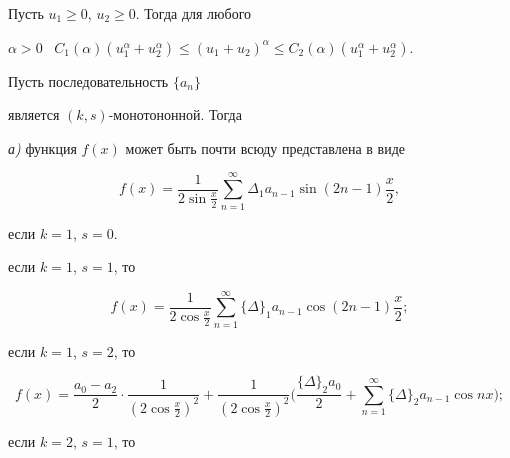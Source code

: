 \begin{lem}


Пусть $u_1\geq 0$, $u_2\geq 0$. Тогда для любого


$\alpha >0$ \ $C_1(\alpha )(u_1^\alpha +u_2^\alpha )\leq


(u_1+u_2)^\alpha \leq C_2(\alpha )(u_1^\alpha +u_2^\alpha )$.


\end{lem}





\begin{lem}


Пусть последовательность $\{a_n\}$


является $(k,s)$-монотононной. Тогда





{\em а)} функция $f(x)$ может быть почти всюду представлена в виде


$$


f(x)=\frac{1}{2\sin\frac{x}{2}}\sum\limits_{n=1}^{\infty}\Delta _1 


a_{n-1}\sin(2n-1)\frac x2,


$$


если $k=1$, $s=0$.





если $k=1$, $s=1$, то


$$


f(x)=\frac{1}{2\cos\frac{x}{2}}\sum\limits_{n=1}^{\infty}\{\Delta \}_1 


a_{n-1}\cos(2n-1)\frac x2;


$$





если $k=1$, $s=2$, то


$$


f(x)=\frac{a_0-a_2}{2}\cdot\frac{1}{(2\cos\frac{x}{2})^2}+


\frac{1}{(2\cos\frac{x}{2})^2}\bigg(


\frac{\{\Delta \}_2 a_0}{2}+\sum\limits_{n=1}^{\infty}\{\Delta \}_2


a_{n-1}\cos nx \bigg);


$$





если $k=2$, $s=1$, то


\begin{multline*}



\end{multline*}
\end{lem}
